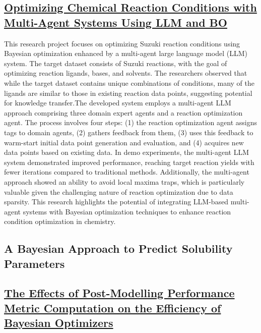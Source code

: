  \subsection*{\href{https://x.com/Bozhao95501764/status/1777029207857451508}{Optimizing Chemical Reaction Conditions with Multi-Agent Systems Using LLM and BO}}

This research project focuses on optimizing Suzuki reaction conditions using Bayesian optimization enhanced by a multi-agent large language model (LLM) system. The target dataset consists of Suzuki reactions, with the goal of optimizing reaction ligands, bases, and solvents. The researchers observed that while the target dataset contains unique combinations of conditions, many of the ligands are similar to those in existing reaction data points, suggesting potential for knowledge transfer.The developed system employs a multi-agent LLM approach comprising three domain expert agents and a reaction optimization agent. The process involves four steps: (1) the reaction optimization agent assigns tags to domain agents, (2) gathers feedback from them, (3) uses this feedback to warm-start initial data point generation and evaluation, and (4) acquires new data points based on existing data. In demo experiments, the multi-agent LLM system demonstrated improved performance, reaching target reaction yields with fewer iterations compared to traditional methods. Additionally, the multi-agent approach showed an ability to avoid local maxima traps, which is particularly valuable given the challenging nature of reaction optimization due to data sparsity. This research highlights the potential of integrating LLM-based multi-agent systems with Bayesian optimization techniques to enhance reaction condition optimization in chemistry.
 \subsection*{A Bayesian Approach to Predict Solubility Parameters}


 \subsection*{\href{https://www.youtube.com/watch?v=kwXHoWV8g1E}{The Effects of Post-Modelling Performance Metric Computation on the Efficiency of Bayesian Optimizers}}

